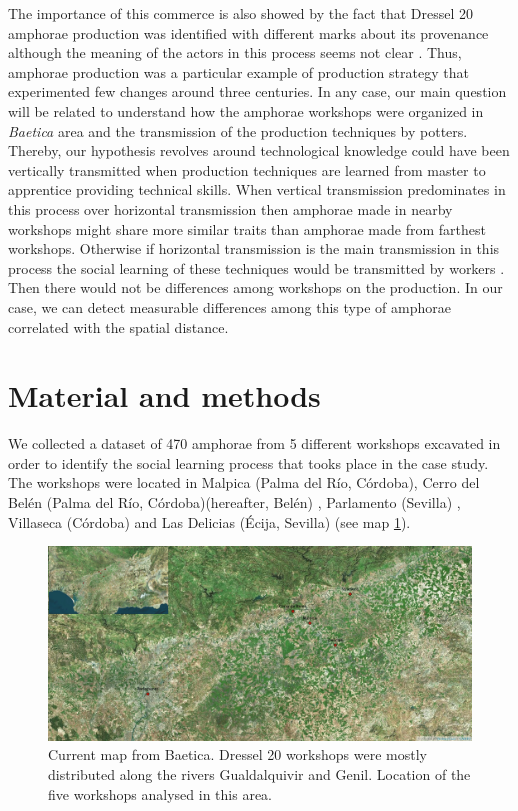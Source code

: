 \documentclass[review]{elsarticle}
\begin{document}
The importance of this commerce is also showed by the fact that Dressel 20 amphorae production was identified with different marks about its provenance although the meaning of the actors in this process seems not clear \citep{coto-sarmiento_maria_bayesian_????}. Thus, amphorae production was a particular example of production strategy that experimented few changes around three centuries. In any case, our main question will be related to understand how the amphorae workshops were organized in \textit{Baetica} area and the transmission of the production techniques by potters. Thereby, our hypothesis revolves around technological knowledge could have been vertically transmitted when production techniques are learned from master to apprentice providing technical skills. When vertical transmission predominates in this process over horizontal transmission then amphorae made in nearby workshops might share more similar traits than amphorae made from farthest workshops. Otherwise if horizontal transmission is the main transmission in this process the social learning of these techniques would be transmitted by workers \citep{hosfield_modes_2009}. Then there would not be differences among workshops on the production. In our case, we can detect measurable differences among this type of amphorae correlated with the spatial distance.


\section{Material and methods}

We collected a dataset of 470 amphorae from 5 different workshops excavated in order to identify the social learning process that tooks place in the case study. The workshops were located in Malpica (Palma del R\'io, C\'ordoba), Cerro del Bel\'en (Palma del R\'io, C\'ordoba)(hereafter, Bel\'en) \citep{diaz_trujillo_excavacion_1992}, Parlamento (Sevilla) \citep{garcia_vargas_anforas_2000}, Villaseca (C\'ordoba)\citep{garcia_vargas_enrique_excavacion_????} and Las Delicias (\'Ecija, Sevilla) \citep{fernandez_excavacion_2001,_atelier_2014} (see map \ref{romanworkshop}).

\begin{figure}[htp]
	\centering
\includegraphics[scale=0.30]{romanworkshop.png}
\caption{Current map from Baetica. Dressel 20 workshops were mostly distributed along the rivers Gualdalquivir and Genil. Location of the five workshops analysed in this area.}
\label{romanworkshop}
\end{figure} 
\end{document}
